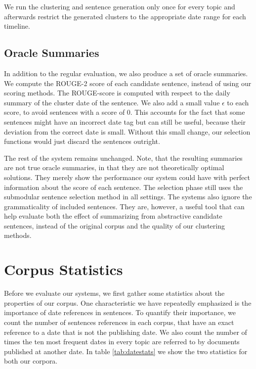 \documentclass[a4paper,BCOR=10mm]{report}
\numberwithin{lemma}{chapter}
\numberwithin{definition}{chapter}
\begin{document}
We run the clustering and sentence generation only once for every topic and afterwards restrict the generated clusters to the appropriate date range for each timeline.

\subsection{Oracle Summaries}

In addition to the regular evaluation, we also produce a set of oracle summaries. We compute the ROUGE-2 score of each candidate sentence, instead of using our scoring methods. The ROUGE-score is computed with respect to the daily summary of the cluster date of the sentence. We also add a small value $\epsilon$ to each score, to avoid sentences with a score of 0. This accounts for the fact that some sentences might have an incorrect date tag but can still be useful, because their deviation from the correct date is small. Without this small change, our selection functions would just discard the sentences outright.

The rest of the system remains unchanged. Note, that the resulting summaries are not true oracle summaries, in that they are not theoretically optimal solutions. They merely show the performance our system could have with perfect information about the score of each sentence. The selection phase still uses the submodular sentence selection method in all settings. The systems also ignore the grammaticality of included sentences.
They are, however, a useful tool that can help evaluate both the effect of summarizing from abstractive candidate sentences, instead of the original corpus and the quality of our clustering methods.



\section{Corpus Statistics} \label{sec:setup-stats}

Before we evaluate our systems, we first gather some statistics about the properties of our corpus.
One characteristic we have repeatedly emphasized is the importance of date references in sentences.
To quantify their importance, we count the number of sentences references in each corpus, that have an exact reference to a date that is not the publishing date.
We also count the number of times the ten most frequent dates in every topic are referred to by documents published at another date.
In table \ref{tab:datestats} we show the two statistics for both our corpora.
\end{document}
